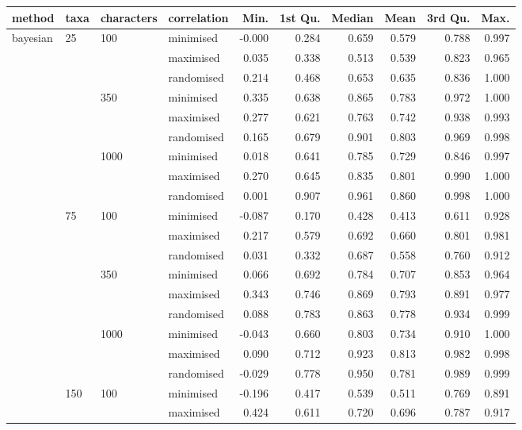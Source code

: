 \begin{longtable}{llllrrrrrr}
  \hline
method & taxa & characters & correlation & Min. & 1st Qu. & Median & Mean & 3rd Qu. & Max. \\ 
  \hline
bayesian & 25 & 100 & minimised & -0.000 & 0.284 & 0.659 & 0.579 & 0.788 & 0.997 \\ 
   &  &  & maximised & 0.035 & 0.338 & 0.513 & 0.539 & 0.823 & 0.965 \\ 
   &  &  & randomised & 0.214 & 0.468 & 0.653 & 0.635 & 0.836 & 1.000 \\ 
   &  & 350 & minimised & 0.335 & 0.638 & 0.865 & 0.783 & 0.972 & 1.000 \\ 
   &  &  & maximised & 0.277 & 0.621 & 0.763 & 0.742 & 0.938 & 0.993 \\ 
   &  &  & randomised & 0.165 & 0.679 & 0.901 & 0.803 & 0.969 & 0.998 \\ 
   &  & 1000 & minimised & 0.018 & 0.641 & 0.785 & 0.729 & 0.846 & 0.997 \\ 
   &  &  & maximised & 0.270 & 0.645 & 0.835 & 0.801 & 0.990 & 1.000 \\ 
   &  &  & randomised & 0.001 & 0.907 & 0.961 & 0.860 & 0.998 & 1.000 \\ 
   & 75 & 100 & minimised & -0.087 & 0.170 & 0.428 & 0.413 & 0.611 & 0.928 \\ 
   &  &  & maximised & 0.217 & 0.579 & 0.692 & 0.660 & 0.801 & 0.981 \\ 
   &  &  & randomised & 0.031 & 0.332 & 0.687 & 0.558 & 0.760 & 0.912 \\ 
   &  & 350 & minimised & 0.066 & 0.692 & 0.784 & 0.707 & 0.853 & 0.964 \\ 
   &  &  & maximised & 0.343 & 0.746 & 0.869 & 0.793 & 0.891 & 0.977 \\ 
   &  &  & randomised & 0.088 & 0.783 & 0.863 & 0.778 & 0.934 & 0.999 \\ 
   &  & 1000 & minimised & -0.043 & 0.660 & 0.803 & 0.734 & 0.910 & 1.000 \\ 
   &  &  & maximised & 0.090 & 0.712 & 0.923 & 0.813 & 0.982 & 0.998 \\ 
   &  &  & randomised & -0.029 & 0.778 & 0.950 & 0.781 & 0.989 & 0.999 \\ 
   & 150 & 100 & minimised & -0.196 & 0.417 & 0.539 & 0.511 & 0.769 & 0.891 \\ 
   &  &  & maximised & 0.424 & 0.611 & 0.720 & 0.696 & 0.787 & 0.917 \\ 

\end{longtable}
